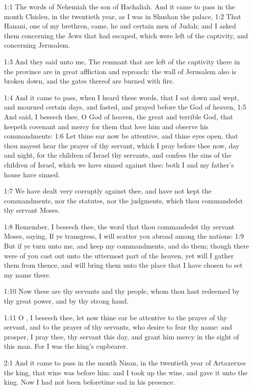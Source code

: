 

1:1 The words of Nehemiah the son of Hachaliah. And it came to pass
in the month Chisleu, in the twentieth year, as I was in Shushan the
palace, 1:2 That Hanani, one of my brethren, came, he and certain men
of Judah; and I asked them concerning the Jews that had escaped, which
were left of the captivity, and concerning Jerusalem.

1:3 And they said unto me, The remnant that are left of the captivity
there in the province are in great affliction and reproach: the wall
of Jerusalem also is broken down, and the gates thereof are burned
with fire.

1:4 And it came to pass, when I heard these words, that I sat down and
wept, and mourned certain days, and fasted, and prayed before the God
of heaven, 1:5 And said, I beseech thee, O \LORD God of heaven, the
great and terrible God, that keepeth covenant and mercy for them that
love him and observe his commandments: 1:6 Let thine ear now be
attentive, and thine eyes open, that thou mayest hear the prayer of
thy servant, which I pray before thee now, day and night, for the
children of Israel thy servants, and confess the sins of the children
of Israel, which we have sinned against thee: both I and my father's
house have sinned.

1:7 We have dealt very corruptly against thee, and have not kept the
commandments, nor the statutes, nor the judgments, which thou
commandedst thy servant Moses.

1:8 Remember, I beseech thee, the word that thou commandedst thy
servant Moses, saying, If ye transgress, I will scatter you abroad
among the nations: 1:9 But if ye turn unto me, and keep my
commandments, and do them; though there were of you cast out unto the
uttermost part of the heaven, yet will I gather them from thence, and
will bring them unto the place that I have chosen to set my name
there.

1:10 Now these are thy servants and thy people, whom thou hast
redeemed by thy great power, and by thy strong hand.

1:11 O \LORD, I beseech thee, let now thine ear be attentive to the
prayer of thy servant, and to the prayer of thy servants, who desire
to fear thy name: and prosper, I pray thee, thy servant this day, and
grant him mercy in the sight of this man. For I was the king's
cupbearer.

2:1 And it came to pass in the month Nisan, in the twentieth year of
Artaxerxes the king, that wine was before him: and I took up the wine,
and gave it unto the king. Now I had not been beforetime sad in his
presence.

